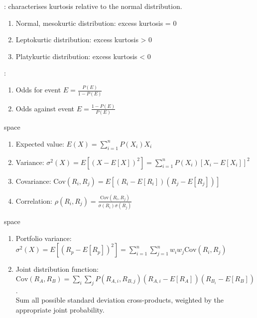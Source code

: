 \begin{definition}
: characterises kurtosis relative to the normal distribution.
\begin{enumerate}[label=\roman*.]
\setlength{\itemsep}{0pt}
\item Normal, mesokurtic distribution: excess kurtosis = 0
\item Leptokurtic distribution: excess kurtosis > 0
\item Platykurtic distribution: excess kurtosis < 0
\end{enumerate}
\end{definition}

\begin{definition}
:
\begin{enumerate}[label=\roman*.]
\setlength{\itemsep}{0pt}
\item Odds for event $E = \frac{P(E)}{1 - P(E)}$
\item Odds against event $E = \frac{1-P(E)}{P(E)}$
\end{enumerate}
\end{definition}

\begin{definition} {\color{white}space}
\begin{enumerate}[label=\roman*.]
\setlength{\itemsep}{0pt}
\item Expected value: $E(X) = \sum\limits_{i=1}^n P(X_i) X_i$
\item Variance: $\sigma^2(X) = E[(X - E[X])^2] = \sum\limits_{i=1}^n P(X_i) [X_i - E[X_i]]^2$
\item Covariance: $\text{Cov}(R_i, R_j) = E[(R_i - E[R_i])(R_j - E[R_j])]$
\item Correlation: $\rho(R_i, R_j) = \frac{\text{Cov}(R_i, R_j)}{\sigma(R_i) \sigma(R_j)}$
\end{enumerate}
\end{definition}

\begin{definition} {\color{white}space}
\begin{enumerate}[label=\roman*.]
\setlength{\itemsep}{0pt}
\item Portfolio variance: $\sigma^2(X) = E[(R_p - E[R_p])^2] = \sum\limits_{i=1}^n \sum\limits_{j=1}^n w_i w_j \text{Cov}(R_i, R_j)$
\item Joint distribution function: $\text{Cov}(R_A, R_B) = \sum\limits_i \sum\limits_j P(R_{A,i}, R_{B,j}) (R_{A,i} - E[R_A]) (R_{B_i} - E[R_B])$.\\
Sum all possible standard deviation cross-products, weighted by the appropriate joint probability.
\end{enumerate}
\end{definition}

